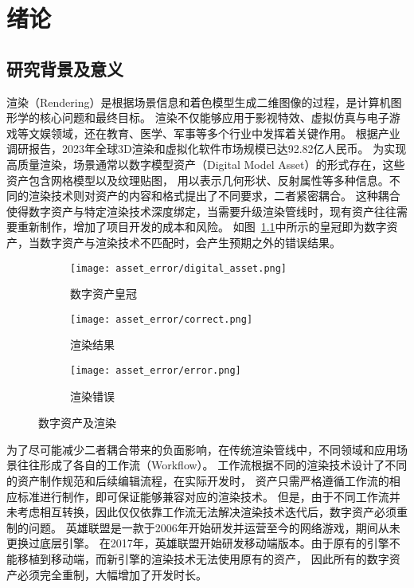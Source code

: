 
\chapter{绪论}
\section{研究背景及意义}
渲染（Rendering）是根据场景信息和着色模型生成二维图像的过程，是计算机图形学的核心问题和最终目标。
渲染不仅能够应用于影视特效、虚拟仿真与电子游戏等文娱领域，还在教育、医学、军事等多个行业中发挥着关键作用。
根据产业调研报告\cite{beizhesi2024}，2023年全球3D渲染和虚拟化软件市场规模已达92.82亿人民币。
为实现高质量渲染，场景通常以数字模型资产（Digital Model Asset）的形式存在，这些资产包含网格模型以及纹理贴图，
用以表示几何形状、反射属性等多种信息。不同的渲染技术则对资产的内容和格式提出了不同要求，二者紧密耦合。
这种耦合使得数字资产与特定渲染技术深度绑定，当需要升级渲染管线时，现有资产往往需要重新制作，增加了项目开发的成本和风险。
如图~\ref{fig:asset_rendering}中所示的皇冠即为数字资产，当数字资产与渲染技术不匹配时，会产生预期之外的错误结果。
\begin{figure}[H]
  \centering
  \begin{subfigure}[t]{0.45\textwidth}
    \centering
    \texttt{[image: asset\_error/digital\_asset.png]}
    \caption{数字资产皇冠}
  \end{subfigure}
  \hspace{3mm}
  \begin{subfigure}[t]{0.225\textwidth}
    \centering
    \texttt{[image: asset\_error/correct.png]}
    \caption{渲染结果}
  \end{subfigure}
  \begin{subfigure}[t]{0.225\textwidth}
    \centering
    \texttt{[image: asset\_error/error.png]}
    \caption{渲染错误}
  \end{subfigure}
  \caption{数字资产及渲染}
  \label{fig:asset_rendering}
\end{figure}

为了尽可能减少二者耦合带来的负面影响，在传统渲染管线中，不同领域和应用场景往往形成了各自的工作流（Workflow）。
工作流根据不同的渲染技术设计了不同的资产制作规范和后续编辑流程，在实际开发时，
资产只需严格遵循工作流的相应标准进行制作，即可保证能够兼容对应的渲染技术。
但是，由于不同工作流并未考虑相互转换，因此仅仅依靠工作流无法解决渲染技术迭代后，数字资产必须重制的问题。
英雄联盟\cite{alec_lol}是一款于2006年开始研发并运营至今的网络游戏，期间从未更换过底层引擎。
在2017年，英雄联盟开始研发移动端版本。由于原有的引擎不能移植到移动端，而新引擎的渲染技术无法使用原有的资产，
因此所有的数字资产必须完全重制，大幅增加了开发时长\cite{xia_lolm}。

